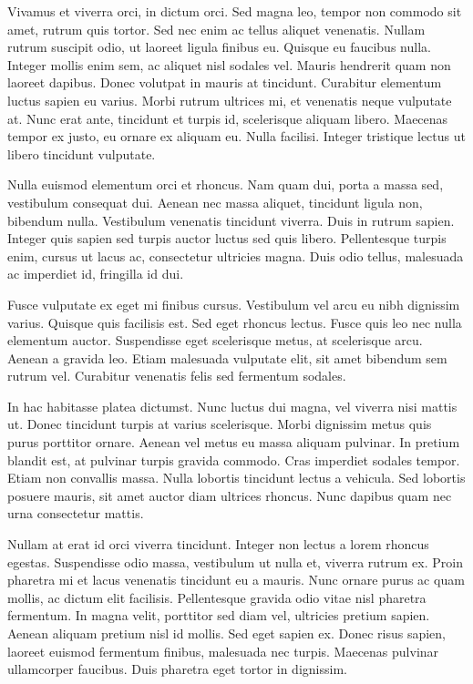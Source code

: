 Vivamus et viverra orci, in dictum orci. Sed magna leo, tempor non commodo sit amet, rutrum quis tortor. Sed nec enim ac tellus aliquet venenatis. Nullam rutrum suscipit odio, ut laoreet ligula finibus eu. Quisque eu faucibus nulla. Integer mollis enim sem, ac aliquet nisl sodales vel. Mauris hendrerit quam non laoreet dapibus. Donec volutpat in mauris at tincidunt. Curabitur elementum luctus sapien eu varius. Morbi rutrum ultrices mi, et venenatis neque vulputate at. Nunc erat ante, tincidunt et turpis id, scelerisque aliquam libero. Maecenas tempor ex justo, eu ornare ex aliquam eu. Nulla facilisi. Integer tristique lectus ut libero tincidunt vulputate.

Nulla euismod elementum orci et rhoncus. Nam quam dui, porta a massa sed, vestibulum consequat dui. Aenean nec massa aliquet, tincidunt ligula non, bibendum nulla. Vestibulum venenatis tincidunt viverra. Duis in rutrum sapien. Integer quis sapien sed turpis auctor luctus sed quis libero. Pellentesque turpis enim, cursus ut lacus ac, consectetur ultricies magna. Duis odio tellus, malesuada ac imperdiet id, fringilla id dui.

Fusce vulputate ex eget mi finibus cursus. Vestibulum vel arcu eu nibh dignissim varius. Quisque quis facilisis est. Sed eget rhoncus lectus. Fusce quis leo nec nulla elementum auctor. Suspendisse eget scelerisque metus, at scelerisque arcu. Aenean a gravida leo. Etiam malesuada vulputate elit, sit amet bibendum sem rutrum vel. Curabitur venenatis felis sed fermentum sodales.

In hac habitasse platea dictumst. Nunc luctus dui magna, vel viverra nisi mattis ut. Donec tincidunt turpis at varius scelerisque. Morbi dignissim metus quis purus porttitor ornare. Aenean vel metus eu massa aliquam pulvinar. In pretium blandit est, at pulvinar turpis gravida commodo. Cras imperdiet sodales tempor. Etiam non convallis massa. Nulla lobortis tincidunt lectus a vehicula. Sed lobortis posuere mauris, sit amet auctor diam ultrices rhoncus. Nunc dapibus quam nec urna consectetur mattis.

Nullam at erat id orci viverra tincidunt. Integer non lectus a lorem rhoncus egestas. Suspendisse odio massa, vestibulum ut nulla et, viverra rutrum ex. Proin pharetra mi et lacus venenatis tincidunt eu a mauris. Nunc ornare purus ac quam mollis, ac dictum elit facilisis. Pellentesque gravida odio vitae nisl pharetra fermentum. In magna velit, porttitor sed diam vel, ultricies pretium sapien. Aenean aliquam pretium nisl id mollis. Sed eget sapien ex. Donec risus sapien, laoreet euismod fermentum finibus, malesuada nec turpis. Maecenas pulvinar ullamcorper faucibus. Duis pharetra eget tortor in dignissim.

